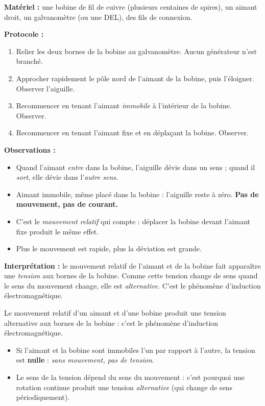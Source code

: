 \documentclass[11pt]{article}
\newcommand{\cle}[1]{{\popxbold\color{popdark}#1}}
\begin{document}
\begin{experience}
\textbf{Matériel :} une bobine de fil de cuivre (plusieurs centaines de spires), un aimant droit, un galvanomètre (ou une DEL), des fils de connexion.

\textbf{Protocole :}
\begin{enumerate}
\item Relier les deux bornes de la bobine au galvanomètre. Aucun générateur n'est branché.
\item Approcher rapidement le pôle nord de l'aimant de la bobine, puis l'éloigner. Observer l'aiguille.
\item Recommencer en tenant l'aimant \emph{immobile} à l'intérieur de la bobine. Observer.
\item Recommencer en tenant l'aimant fixe et en déplaçant la bobine. Observer.
\end{enumerate}

\textbf{Observations :}
\begin{itemize}
\item Quand l'aimant \emph{entre} dans la bobine, l'aiguille dévie dans un sens ; quand il \emph{sort}, elle dévie dans l'\emph{autre sens}.
\item Aimant immobile, même placé dans la bobine : l'aiguille reste à zéro. \textbf{Pas de mouvement, pas de courant.}
\item C'est le \emph{mouvement relatif} qui compte : déplacer la bobine devant l'aimant fixe produit le même effet.
\item Plus le mouvement est rapide, plus la déviation est grande.
\end{itemize}

\textbf{Interprétation :} le mouvement relatif de l'aimant et de la bobine fait apparaître une \emph{tension} aux bornes de la bobine. Comme cette tension change de sens quand le sens du mouvement change, elle est \emph{alternative}. C'est le phénomène d'\cle{induction électromagnétique}.
\end{experience}

\begin{propriete}
Le \cle{mouvement relatif} d'un aimant et d'une bobine produit une \cle{tension alternative} aux bornes de la bobine : c'est le phénomène d'\cle{induction électromagnétique}.
\begin{itemize}
\item Si l'aimant et la bobine sont immobiles l'un par rapport à l'autre, la tension est \textbf{nulle} : \emph{sans mouvement, pas de tension}.
\item Le sens de la tension dépend du sens du mouvement : c'est pourquoi une rotation continue produit une tension \emph{alternative} (qui change de sens périodiquement).
\end{itemize}
\end{propriete}
\end{document}
